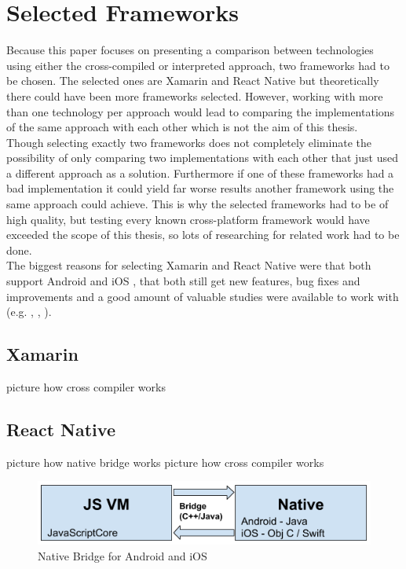 \documentclass[Bachelor,BIF,english]{twbook}
\begin{document}
\chapter{Selected Frameworks}
Because this paper focuses on presenting a comparison between technologies using either the cross-compiled or interpreted approach, two frameworks had to be chosen. The selected ones are Xamarin and React Native but theoretically there could have been more frameworks selected. However, working with more than one technology per approach would lead to comparing the implementations of the same approach with each other which is not the aim of this thesis. 
\\[\baselineskip]
Though selecting exactly two frameworks does not completely eliminate the possibility of only comparing two implementations with each other that just used a different approach as a solution. Furthermore if one of these frameworks had a bad implementation it could yield far worse results another framework using the same approach could achieve. This is why the selected frameworks had to be of high quality, but testing every known cross-platform framework would have exceeded the scope of this thesis, so lots of researching for related work had to be done. 
\\[\baselineskip]
The biggest reasons for selecting Xamarin and React Native were that both support Android and iOS \cite[p.~1]{JohanssonSderberg2018} \cite[p.~12]{ZubaBernhard2017EdPb}, that both still get new features, bug fixes and improvements \cite{XamarinRoadmap} \cite{ReactNativeRoadmap} and a good amount of valuable studies were available to work with (e.g. \cite{Hansson_Vidhall_2016}, \cite{MartinezLecomte2018}, \cite{GaouarBenamarBendimerad2016}).

\section{Xamarin}
\cite[p.~14-20]{ZubaBernhard2017EdPb} picture how cross compiler works

\section{React Native}
\cite{Hansson_Vidhall_2016} \cite{Danielsson_2016} \cite[p.~21-32]{ZubaBernhard2017EdPb} picture how native bridge works
\cite[p.~14-20]{ZubaBernhard2017EdPb} picture how cross compiler works
\begin{figure}[!htbp]
\centering
\includegraphics[width=0.75\linewidth]{PICs/Bachelor1_NativeBridge.png}
\caption{Native Bridge for Android and iOS \cite{PicReactNativeBridge} \cite[p.~28]{ZubaBernhard2017EdPb}}\label{Fig4}
\end{figure}
\end{document}
